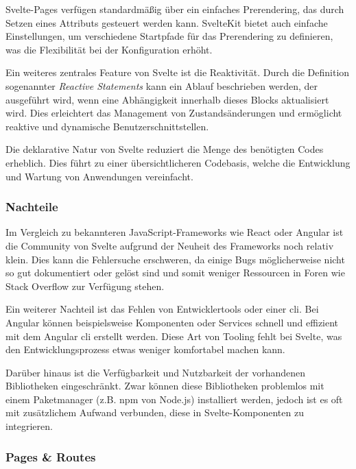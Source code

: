 Svelte-Pages verfügen standardmäßig über ein einfaches Prerendering, das durch Setzen eines Attributs gesteuert werden kann. SvelteKit bietet auch einfache Einstellungen, um verschiedene Startpfade für das Prerendering zu definieren, was die Flexibilität bei der Konfiguration erhöht. \autocite{SvelteExperienceBespoyasov}

Ein weiteres zentrales Feature von Svelte ist die Reaktivität. Durch die Definition sogenannter \textit{Reactive Statements} kann ein Ablauf beschrieben werden, der ausgeführt wird, wenn eine Abhängigkeit innerhalb dieses Blocks aktualisiert wird. Dies erleichtert das Management von Zustandsänderungen und ermöglicht reaktive und dynamische Benutzerschnittstellen. \autocite{SvelteExperienceBespoyasov}

Die deklarative Natur von Svelte reduziert die Menge des benötigten Codes erheblich. Dies führt zu einer übersichtlicheren Codebasis, welche die Entwicklung und Wartung von Anwendungen vereinfacht.\autocite{SvelteExperienceBespoyasov}

\subsubsection{Nachteile}

Im Vergleich zu bekannteren JavaScript-Frameworks wie React oder Angular ist die Community von Svelte aufgrund der Neuheit des Frameworks noch relativ klein. Dies kann die Fehlersuche erschweren, da einige Bugs möglicherweise nicht so gut dokumentiert oder gelöst sind und somit weniger Ressourcen in Foren wie Stack Overflow zur Verfügung stehen. \autocite{SvelteVsSvelteKit2023}

Ein weiterer Nachteil ist das Fehlen von Entwicklertools oder einer \ac{cli}. Bei Angular können beispielsweise Komponenten oder Services schnell und effizient mit dem Angular \ac{cli} erstellt werden. Diese Art von Tooling fehlt bei Svelte, was den Entwicklungsprozess etwas weniger komfortabel machen kann. \autocite{SvelteVsSvelteKit2023}

Darüber hinaus ist die Verfügbarkeit und Nutzbarkeit der vorhandenen Bibliotheken eingeschränkt. Zwar können diese Bibliotheken problemlos mit einem Paketmanager (z.B. npm von Node.js) installiert werden, jedoch ist es oft mit zusätzlichem Aufwand verbunden, diese in Svelte-Komponenten zu integrieren.\autocite{SvelteVsSvelteKit2023}

\subsubsection{Pages \& Routes}

